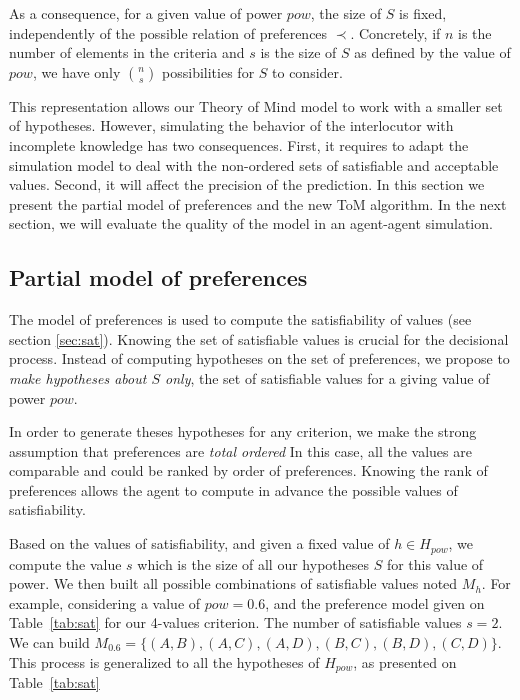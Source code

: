 \documentclass[sigconf]{aamas}  %
\begin{document}
	As a consequence, for a given value of power $pow$, the size of $S$ is fixed, independently of the possible relation of preferences $\prec$. Concretely, if $n$ is the number of elements in the criteria and $s$ is the size of $S$ as defined by the value of $pow$, we have only $\binom{n}{s}$ possibilities for $S$ to consider.
	
	This representation allows our Theory of Mind model to work with a smaller set of hypotheses. However, simulating the behavior of the interlocutor with incomplete knowledge has two consequences. First, it requires to adapt the simulation model to deal with the non-ordered sets of satisfiable and acceptable values. Second, it will affect the precision of the prediction. In this section we present the partial model of preferences and the new ToM algorithm. In the next section, we will evaluate the quality of the model in an agent-agent simulation.
	
	\subsection{Partial model of preferences}
	
	The model of preferences is used to compute the satisfiability of values (see section \ref{sec:sat}). Knowing the set of satisfiable values is crucial for the decisional process. Instead of computing hypotheses on the set of preferences, we propose to \emph{make hypotheses about $S$ only}, the set of satisfiable values for a giving value of power $pow$.  
	
	In order to generate theses hypotheses for any criterion, we make the strong assumption that preferences are \emph{total ordered} In this case, all the values are comparable and could be ranked by order of preferences. Knowing the rank of preferences allows the agent to compute in advance the possible values of satisfiability.

	Based on the values of satisfiability, and given a fixed value of $h \in H_{pow}$, we compute the value $s$ which is the size of all our hypotheses $S$ for this value of power. We then built all possible combinations of satisfiable values  noted $M_h$. For example, considering a value of $pow =0.6$, and the preference model given on Table~\ref{tab:sat} for our 4-values criterion. The number of satisfiable values $s=2$. We can build $M_{0.6} = \{(A,B), (A,C), (A,D), (B,C), (B,D), (C,D)\}$. This process is generalized to all the hypotheses of $H_{pow}$, as presented on Table~\ref{tab:sat}
	
\end{document}
